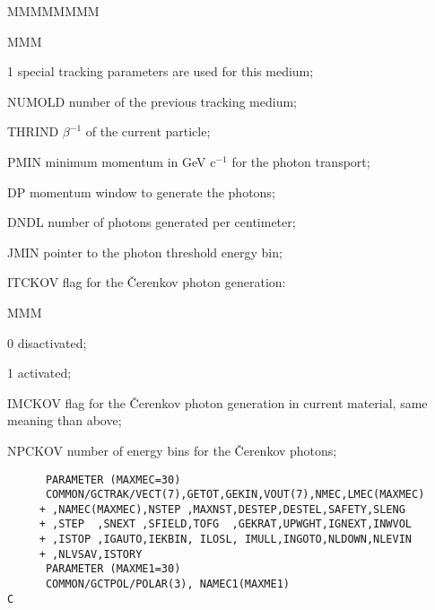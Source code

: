\begin{DLtt}{MMMMMMMM}
\begin{DLtt}{MMM}
\item[1] special tracking parameters are used for this medium;
\end{DLtt}
\item[NUMOLD] number of the previous tracking medium;
\item[THRIND] $\beta^{-1}$ of the current particle;
\item[PMIN] minimum momentum in GeV c$^{-1}$ for the photon transport;
\item[DP] momentum window to generate the photons;
\item[DNDL] number of photons generated per centimeter;
\item[JMIN] pointer to the photon threshold energy bin;
\item[ITCKOV] flag for the \v{C}erenkov photon generation:
\begin{DLtt}{MMM}
\item[0] disactivated;
\item[1] activated;
\end{DLtt}
\item[IMCKOV] flag for the \v{C}erenkov photon generation in current
material, same meaning than above;
\item[NPCKOV] number of energy bins for the \v{C}erenkov photons;
\end{DLtt}
\begin{verbatim}
      PARAMETER (MAXMEC=30)
      COMMON/GCTRAK/VECT(7),GETOT,GEKIN,VOUT(7),NMEC,LMEC(MAXMEC)
     + ,NAMEC(MAXMEC),NSTEP ,MAXNST,DESTEP,DESTEL,SAFETY,SLENG
     + ,STEP  ,SNEXT ,SFIELD,TOFG  ,GEKRAT,UPWGHT,IGNEXT,INWVOL
     + ,ISTOP ,IGAUTO,IEKBIN, ILOSL, IMULL,INGOTO,NLDOWN,NLEVIN
     + ,NLVSAV,ISTORY
      PARAMETER (MAXME1=30)
      COMMON/GCTPOL/POLAR(3), NAMEC1(MAXME1)
C
\end{verbatim}
